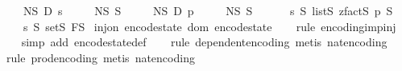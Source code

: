 \begin{isabellebody}
\ \ \ \ N\isactrlsub S\ {\isasymtimes}\isactrlsub D\ {\isacharparenleft}{\kern0pt}{\isasymlambda}s{\isachardot}{\kern0pt}\ \isanewline
\ \ \ \ N\isactrlsub S\ {\isasymtimes}\isactrlsub S\ {\isacharparenleft}{\kern0pt}\isanewline
\ \ \ \ N\isactrlsub S\ {\isasymtimes}\isactrlsub D\ {\isacharparenleft}{\kern0pt}{\isasymlambda}p{\isachardot}{\kern0pt}\ \isanewline
\ \ \ \ N\isactrlsub S\ {\isasymtimes}\isactrlsub S\ {\isacharparenleft}{\kern0pt}\ \isanewline
\ \ \ \ {\isacharparenleft}{\kern0pt}{\isacharbrackleft}{\kern0pt}{}{\isachardot}{\kern0pt}{\isachardot}{\kern0pt}{\isacharless}{\kern0pt}s{\isacharbrackright}{\kern0pt}\ {\isasymrightarrow}\isactrlsub S\ {\isacharparenleft}{\kern0pt}list\isactrlsub S\ {\isacharparenleft}{\kern0pt}zfact\isactrlsub S\ p{\isacharparenright}{\kern0pt}{\isacharparenright}{\kern0pt}{\isacharparenright}{\kern0pt}\ {\isasymtimes}\isactrlsub S\isanewline
\ \ \ \ {\isacharparenleft}{\kern0pt}{\isacharbrackleft}{\kern0pt}{}{\isachardot}{\kern0pt}{\isachardot}{\kern0pt}{\isacharless}{\kern0pt}s{\isacharbrackright}{\kern0pt}\ {\isasymrightarrow}\isactrlsub S\ {\isacharparenleft}{\kern0pt}set\isactrlsub S\ F\isactrlsub S{\isacharparenright}{\kern0pt}{\isacharparenright}{\kern0pt}{\isacharparenright}{\kern0pt}{\isacharparenright}{\kern0pt}{\isacharparenright}{\kern0pt}{\isacharparenright}{\kern0pt}{\isachardoublequoteclose}\isanewline
\isanewline
{}\isamarkupfalse%
\ {\isachardoublequoteopen}inj{\isacharunderscore}{\kern0pt}on\ encode{\isacharunderscore}{\kern0pt}state\ {\isacharparenleft}{\kern0pt}dom\ encode{\isacharunderscore}{\kern0pt}state{\isacharparenright}{\kern0pt}{\isachardoublequoteclose}\isanewline
%
\isadelimproof
\ \ %
\endisadelimproof
%
\isatagproof
{}\isamarkupfalse%
\ {\isacharparenleft}{\kern0pt}rule\ encoding{\isacharunderscore}{\kern0pt}imp{\isacharunderscore}{\kern0pt}inj{\isacharparenright}{\kern0pt}\isanewline
\ \ \isamarkupfalse%
\ {\isacharparenleft}{\kern0pt}simp\ add{\isacharcolon}{\kern0pt}\ encode{\isacharunderscore}{\kern0pt}state{\isacharunderscore}{\kern0pt}def{\isacharparenright}{\kern0pt}\isanewline
\ \ \isamarkupfalse%
\ {\isacharparenleft}{\kern0pt}rule\ dependent{\isacharunderscore}{\kern0pt}encoding{\isacharcomma}{\kern0pt}\ metis\ nat{\isacharunderscore}{\kern0pt}encoding{\isacharparenright}{\kern0pt}\isanewline
\ \ \isamarkupfalse%
\ {\isacharparenleft}{\kern0pt}rule\ prod{\isacharunderscore}{\kern0pt}encoding{\isacharcomma}{\kern0pt}\ metis\ nat{\isacharunderscore}{\kern0pt}encoding{\isacharparenright}{\kern0pt}\isanewline

\end{isabellebody}
